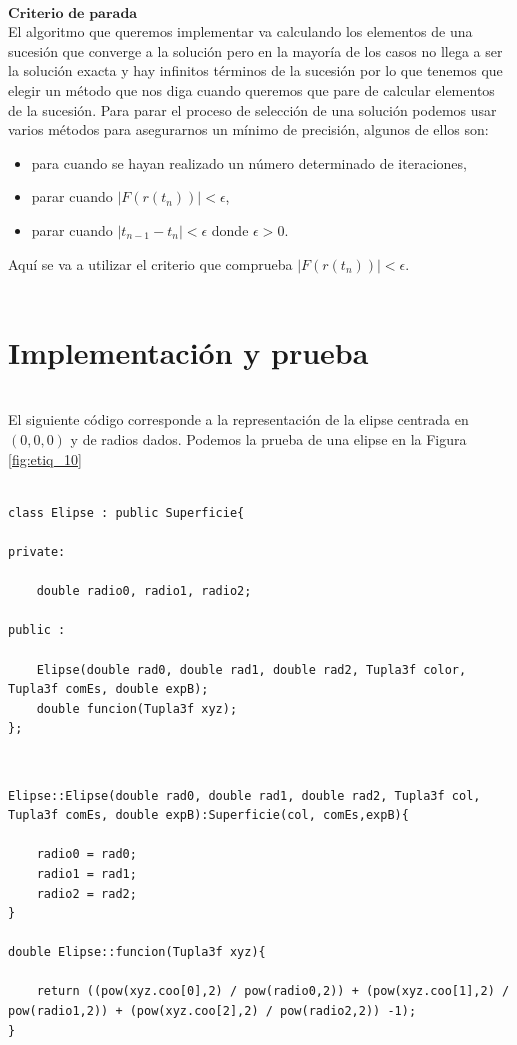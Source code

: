 ${ }$\\
$\textbf{Criterio de parada}$
${ }$\\

El algoritmo que queremos implementar va calculando los elementos de una sucesión que converge a la solución pero en la mayoría de los casos no llega a ser la solución exacta y hay infinitos términos de la sucesión por lo que tenemos que elegir un método que nos diga cuando queremos que pare de calcular elementos de la sucesión. Para parar el proceso de selección de una solución podemos usar varios métodos para asegurarnos un mínimo de precisión, algunos de ellos son:
\begin{itemize}
	\item para cuando se hayan realizado un número determinado de iteraciones,
	\item parar cuando $|F(r(t_n))| < \epsilon$,
	\item parar cuando $|t_{n-1} - t_n| < \epsilon$ donde $\epsilon > 0$.
\end{itemize}
Aquí se va a utilizar el criterio que comprueba $|F(r(t_n))| < \epsilon$.
${ }$\\




${ }$\\
\section{Implementación y prueba}
${ }$\\

El siguiente código corresponde a la representación de la elipse centrada en $(0,0,0)$ y de radios dados. Podemos la prueba de una elipse en la Figura \ref{fig:etiq_10}
${ }$\\

\begin{lstlisting}[style=Consola]

class Elipse : public Superficie{

private:

	double radio0, radio1, radio2;

public :

	Elipse(double rad0, double rad1, double rad2, Tupla3f color, Tupla3f comEs, double expB);
	double funcion(Tupla3f xyz);
};
\end{lstlisting}
${ }$\\

\begin{lstlisting}[style=Consola]
Elipse::Elipse(double rad0, double rad1, double rad2, Tupla3f col, Tupla3f comEs, double expB):Superficie(col, comEs,expB){

	radio0 = rad0;
	radio1 = rad1;
	radio2 = rad2;
}

double Elipse::funcion(Tupla3f xyz){

	return ((pow(xyz.coo[0],2) / pow(radio0,2)) + (pow(xyz.coo[1],2) / pow(radio1,2)) + (pow(xyz.coo[2],2) / pow(radio2,2)) -1);
}
\end{lstlisting}
${ }$\\




